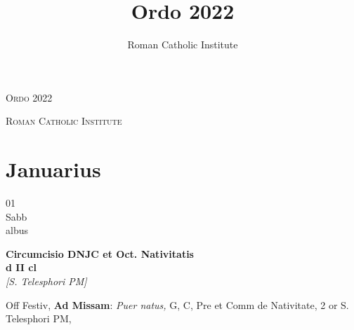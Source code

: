 \documentclass[10pt, openany]{book}
\title{Ordo 2022}
\author{Roman Catholic Institute}
\begin{document}
        \begin{titlepage}
            \begin{center}
                {\fontsize{50}{60}\selectfont \textsc{Ordo 2022}}
            \end{center}
            \begin{center}
                {\footnotesize \textsc{Roman Catholic Institute}}
            \end{center}
        \end{titlepage}
        \clearpage\begingroup\pagestyle{empty}\cleardoublepage\endgroup
    
        \chapter{Januarius}
                        
        \begin{center}
            \begin{minipage}{3.5in}
                \vspace{2em}
                \begin{minipage}{0.5in}
                    {\Huge 01} \\
                    {\normalsize Sabb} \\
                    {\normalsize albus}
                \end{minipage}
                \begin{minipage}{3.0in}
                    \textbf{ \large Circumcisio DNJC et Oct. Nativitatis \\
                    \textnormal{\normalsize d II cl}} \\ \textit{[S. Telesphori PM]} \\ 
                \end{minipage}
                \begin{justify}Off Festiv, \textbf{Ad Missam}: \textit{Puer natus,} G, C, Pre et Comm de Nativitate, 2 or S. Telesphori PM,   
                \end{justify}
            \end{minipage}
        \end{center}
    
\end{document}
